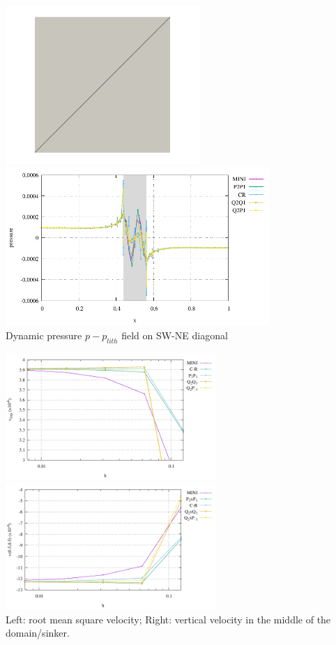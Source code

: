 \begin{center}
\includegraphics[height=6cm]{python_codes/fieldstone_112/results/exp2/diag.png}
\includegraphics[height=6cm]{python_codes/fieldstone_112/results/exp2/diag_profile_p.pdf}\\
{\captionfont Dynamic pressure $p-p_{lith}$ field on SW-NE diagonal}
\end{center}


\begin{center}
\includegraphics[width=8cm]{python_codes/fieldstone_112/results/exp2/vrms.pdf}
\includegraphics[width=8cm]{python_codes/fieldstone_112/results/exp2/v_center.pdf}\\
{\captionfont Left: root mean square velocity; Right: vertical velocity in the middle of the domain/sinker.}
\end{center}


